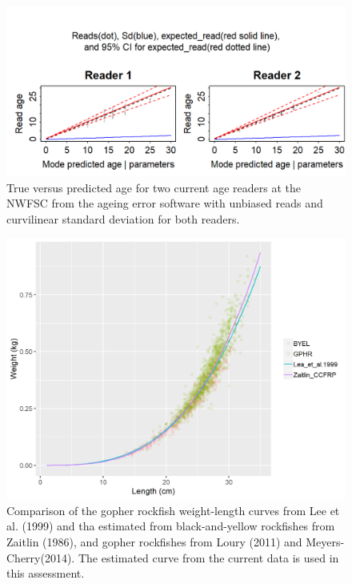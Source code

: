 \documentclass[12pt,]{article}
\begin{document}
\FloatBarrier

\begin{figure}
\centering
\includegraphics{Figures/GBY_age_error2.png}
\caption{True versus predicted age for two current age readers at the
NWFSC from the ageing error software with unbiased reads and curvilinear
standard deviation for both readers. \label{fig:GBY_age_error2}}
\end{figure}

\begin{figure}
\centering
\includegraphics{Figures/GBY_weight_length.png}
\caption{Comparison of the gopher rockfish weight-length curves from Lee
et al. (1999) and tha estimated from black-and-yellow rockfishes from
Zaitlin (1986), and gopher rockfishes from Loury (2011) and
Meyers-Cherry(2014). The estimated curve from the current data is used
in this assessment. \label{fig:GBY_weight_length}}
\end{figure}
\end{document}
